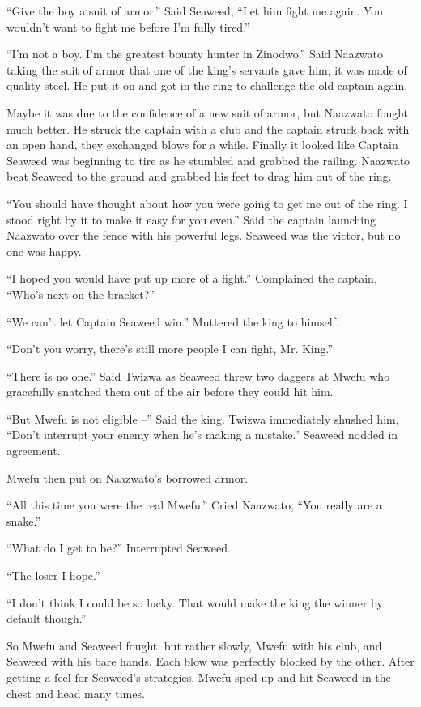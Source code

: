 ``Give the boy a suit of armor.'' Said Seaweed, ``Let him fight me again. You wouldn't want to fight me before I'm fully tired.''

``I'm not a boy. I'm the greatest bounty hunter in Zinodwo.'' Said Naazwato taking the suit of armor that one of the king's servants gave him; it was made of quality steel. He put it on and got in the ring to challenge the old captain again.

Maybe it was due to the confidence of a new suit of armor, but Naazwato fought much better. He struck the captain with a club and the captain struck back with an open hand, they exchanged blows for a while. Finally it looked like Captain Seaweed was beginning to tire as he stumbled and grabbed the railing. Naazwato beat Seaweed to the ground and grabbed his feet to drag him out of the ring.

``You should have thought about how you were going to get me out of the ring. I stood right by it to make it easy for you even.'' Said the captain launching Naazwato over the fence with his powerful legs.
Seaweed was the victor, but no one was happy.

``I hoped you would have put up more of a fight.'' Complained the captain, ``Who's next on the bracket?''

``We can't let Captain Seaweed win.'' Muttered the king to himself.

``Don't you worry, there's still more people I can fight, Mr. King.''

``There is no one.'' Said Twizwa as Seaweed threw two daggers at Mwefu who gracefully snatched them out of the air before they could hit him. 

``But Mwefu is not eligible --'' Said the king. Twizwa immediately shushed him, ``Don't interrupt your enemy when he's making a mistake.'' Seaweed nodded in agreement.

Mwefu then put on Naazwato's borrowed armor.

``All this time you were the real Mwefu.'' Cried Naazwato, ``You really are a snake.''

``What do I get to be?'' Interrupted Seaweed.

``The loser I hope.''

``I don't think I could be so lucky. That would make the king the winner by default though.''

So Mwefu and Seaweed fought, but rather slowly, Mwefu with his club, and Seaweed with his bare hands.
Each blow was perfectly blocked by the other. After getting a feel for Seaweed's strategies, Mwefu sped up and hit Seaweed in the chest and head many times.

